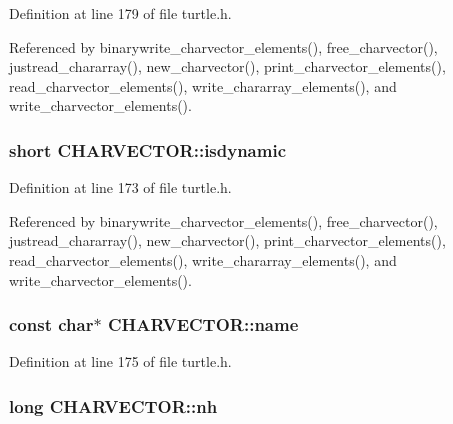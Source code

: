 Definition at line 179 of file turtle.\-h.



Referenced by binarywrite\-\_\-charvector\-\_\-elements(), free\-\_\-charvector(), justread\-\_\-chararray(), new\-\_\-charvector(), print\-\_\-charvector\-\_\-elements(), read\-\_\-charvector\-\_\-elements(), write\-\_\-chararray\-\_\-elements(), and write\-\_\-charvector\-\_\-elements().

\hypertarget{struct_c_h_a_r_v_e_c_t_o_r_a1feff0cafeaa4097ac6c0af7505d8c03}{
\subsubsection[{isdynamic}]{\setlength{\rightskip}{0pt plus 5cm}short C\-H\-A\-R\-V\-E\-C\-T\-O\-R\-::isdynamic}}\label{struct_c_h_a_r_v_e_c_t_o_r_a1feff0cafeaa4097ac6c0af7505d8c03}


Definition at line 173 of file turtle.\-h.



Referenced by binarywrite\-\_\-charvector\-\_\-elements(), free\-\_\-charvector(), justread\-\_\-chararray(), new\-\_\-charvector(), print\-\_\-charvector\-\_\-elements(), read\-\_\-charvector\-\_\-elements(), write\-\_\-chararray\-\_\-elements(), and write\-\_\-charvector\-\_\-elements().

\hypertarget{struct_c_h_a_r_v_e_c_t_o_r_ab0655d3029c88c4b6957237c9b5ed6f1}{
\subsubsection[{name}]{\setlength{\rightskip}{0pt plus 5cm}const char$\ast$ C\-H\-A\-R\-V\-E\-C\-T\-O\-R\-::name}}\label{struct_c_h_a_r_v_e_c_t_o_r_ab0655d3029c88c4b6957237c9b5ed6f1}


Definition at line 175 of file turtle.\-h.

\hypertarget{struct_c_h_a_r_v_e_c_t_o_r_ac2f6d212310d8164e8923553c7029df0}{
\subsubsection[{nh}]{\setlength{\rightskip}{0pt plus 5cm}long C\-H\-A\-R\-V\-E\-C\-T\-O\-R\-::nh}}\label{struct_c_h_a_r_v_e_c_t_o_r_ac2f6d212310d8164e8923553c7029df0}


